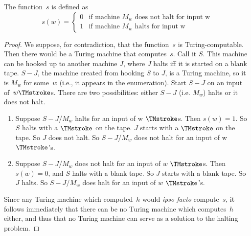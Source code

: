 \documentclass[../../include/open-logic-section]{subfiles}
\begin{document}
\begin{defn} The function~$s$ is defined as
\[
s(w) =
\begin{cases}
  \text{0} & \text{if machine~$M_w$ does not halt for input w} \\
  \text{1} & \text{if machine~$M_w$ halts for input w}
\end{cases}
\]
\end{defn}

\begin{proof}
We suppose, for contradiction, that the function~$s$ is Turing-computable.
Then there would be a Turing machine that computes~$s$. Call it $S$. This
machine can be hooked up to another machine $J$, where $J$ halts iff it is
started on a blank tape. $S-J$, the machine created from hooking $S$ to
$J$, is a
Turing machine, so it is $M_w$ for some~$w$ (i.e., it appears in the
enumeration). Start $S-J$ on an input of~$w \TMstroke$s. There are two
possibilities: either $S-J$ (i.e. $M_w$) halts or it does not halt.
\begin{enumerate}
\item Suppose $S-J$/$M_w$ halts for an input of w $\TMstroke$s. Then
  $s(w) = 1$. So $S$ halts with a $\TMstroke$ on the tape.  $J$ starts
  with a $\TMstroke$ on the tape. So $J$ does not halt. So $S-J$/$M_w$
  does not halt for an input of w $\TMstroke$'s.

\item Suppose $S-J$/$M_w$ does not halt for an input of $w$
  $\TMstroke$s.  Then $s(w) = 0$, and $S$ halts with a blank tape. So
  $J$ starts with a blank tape.  So $J$ halts. So $S-J$/$M_w$ does
  halt for an input of $w$ $\TMstroke$'s.
\end{enumerate}

Since any Turing machine which computed~$h$ would \emph{ipso facto}
compute~$s$, it follows immediately that there can be no Turing machine
which computes~$h$ either, and thus that no Turing machine can serve as a
solution to the halting problem.
\end{proof}
\end{document}
